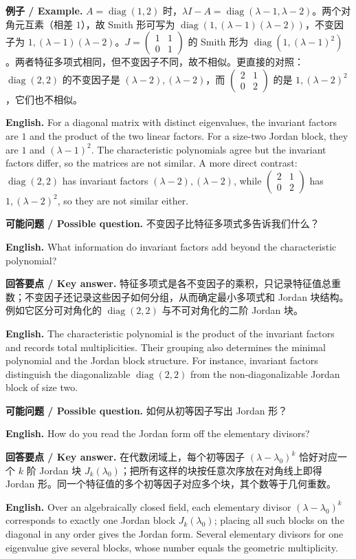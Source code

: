 \documentclass[UTF8,11pt,a4paper]{ctexart}
\newcommand{\EN}[1]{\par\noindent\textbf{English.} #1\par}
\newcommand{\EX}[2]{\par\noindent\textbf{例子 / Example.} #1\par\EN{#2}}
\newcommand{\ASK}[4]{\par\noindent\textbf{可能问题 / Possible question.} #1\par\EN{#2}\noindent\textbf{回答要点 / Key answer.} #3\par\EN{#4}\medskip}
\begin{document}
\EX{$A=\operatorname{diag}(1,2)$ 时，$\lambda I-A=\operatorname{diag}(\lambda-1,\lambda-2)$。两个对角元互素（相差 $1$），故 Smith 形可写为 $\operatorname{diag}(1,(\lambda-1)(\lambda-2))$，不变因子为 $1,(\lambda-1)(\lambda-2)$。$J=\begin{pmatrix}1&1\\0&1\end{pmatrix}$ 的 Smith 形为 $\operatorname{diag}(1,(\lambda-1)^2)$。两者特征多项式相同，但不变因子不同，故不相似。更直接的对照：$\operatorname{diag}(2,2)$ 的不变因子是 $(\lambda-2),(\lambda-2)$，而 $\left(\begin{smallmatrix}2&1\\0&2\end{smallmatrix}\right)$ 的是 $1,(\lambda-2)^2$，它们也不相似。}{For a diagonal matrix with distinct eigenvalues, the invariant factors are $1$ and the product of the two linear factors. For a size-two Jordan block, they are $1$ and $(\lambda-1)^2$. The characteristic polynomials agree but the invariant factors differ, so the matrices are not similar. A more direct contrast: $\operatorname{diag}(2,2)$ has invariant factors $(\lambda-2),(\lambda-2)$, while $\left(\begin{smallmatrix}2&1\\0&2\end{smallmatrix}\right)$ has $1,(\lambda-2)^2$, so they are not similar either.}
\ASK{不变因子比特征多项式多告诉我们什么？}{What information do invariant factors add beyond the characteristic polynomial?}{特征多项式是各不变因子的乘积，只记录特征值总重数；不变因子还记录这些因子如何分组，从而确定最小多项式和 Jordan 块结构。例如它区分可对角化的 $\operatorname{diag}(2,2)$ 与不可对角化的二阶 Jordan 块。}{The characteristic polynomial is the product of the invariant factors and records total multiplicities. Their grouping also determines the minimal polynomial and the Jordan block structure. For instance, invariant factors distinguish the diagonalizable $\operatorname{diag}(2,2)$ from the non-diagonalizable Jordan block of size two.}
\ASK{如何从初等因子写出 Jordan 形？}{How do you read the Jordan form off the elementary divisors?}{在代数闭域上，每个初等因子 $(\lambda-\lambda_0)^k$ 恰好对应一个 $k$ 阶 Jordan 块 $J_k(\lambda_0)$；把所有这样的块按任意次序放在对角线上即得 Jordan 形。同一个特征值的多个初等因子对应多个块，其个数等于几何重数。}{Over an algebraically closed field, each elementary divisor $(\lambda-\lambda_0)^k$ corresponds to exactly one Jordan block $J_k(\lambda_0)$; placing all such blocks on the diagonal in any order gives the Jordan form. Several elementary divisors for one eigenvalue give several blocks, whose number equals the geometric multiplicity.}
\end{document}
